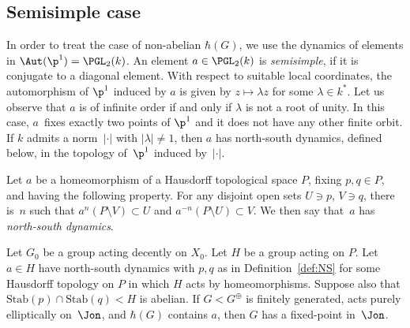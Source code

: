 \subsection{Semisimple case}

In order to treat the case of non-abelian $\hbar(G)$, we use the dynamics of elements in $\Aut(\p^1)=\PGL_2(k)$.
An element $a\in\PGL_2(k)$ is \emph{semisimple}, if it is conjugate to a diagonal element. With respect to suitable local coordinates, the automorphism of $\p^1$ induced by $a$ is given by $z\mapsto \lambda z$ for some $\lambda\in k^*$. Let us observe that $a$ is of infinite order if and only if $\lambda$ is not a root of unity. In this case, $a$~fixes exactly two points of $\p^1$ and it does not have any other finite orbit. If $k$ admits a norm~$|\cdot|$ with $|\lambda|\neq 1$, then $a$ has north-south dynamics, defined below, in the topology of~$\p^1$ induced by~$|\cdot|$.

\begin{definition}
\label{def:NS}
Let $a$ be a homeomorphism of a Hausdorff topological space $P$, fixing $p,q\in P$, and having the following property. For any disjoint open sets $U\ni p$, $V\ni q$, there is~$n$ such that $a^n(P\setminus V)\subset U$ and $a^{-n}(P\setminus U)\subset V$.
We then say that~$a$ has \emph{north-south dynamics}.
\end{definition}

\begin{lemma}
\label{lem:semisimple}
Let $G_0$ be a group acting decently on $X_0$. Let $H$ be a group acting on $P$. Let $a\in H$ have north-south dynamics {with $p,q$ as in Definition~\ref{def:NS}} for some Hausdorff topology on $P$ in which $H$ acts by homeomorphisms. Suppose also that \hbox{$\mathrm{Stab}(p)\cap\mathrm{Stab}(q)<H$} is abelian.
If $G<G^\oplus$ is finitely generated, acts purely elliptically on~$\Jon$, and $\hbar(G)$ contains $a$, then $G$ has a fixed-point in~$\Jon$.
\end{lemma}

